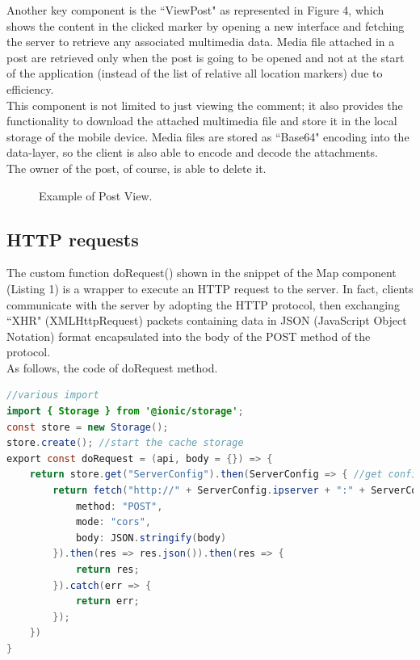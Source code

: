 \documentclass[conference]{IEEEtran}
\begin{document}
Another key component is the ``ViewPost" as represented in Figure 4, which shows the content in the clicked marker by opening a new interface and fetching the server to retrieve any associated multimedia data.
Media file attached in a post are retrieved only when the post is going to be opened and not at the start of the application (instead of the list of relative all location markers) due to efficiency.
\\
This component is not limited to just viewing the comment; it also provides the functionality to download the attached multimedia file and store it in the local storage of the mobile device.
Media files are stored as ``Base64" encoding into the data-layer, so the client is also able to encode and decode the attachments.
\\
The owner of the post, of course, is able to delete it.

\begin{figure}[htbp]
\begin{center}
\end{center}
\caption{Example of Post View.}
\label{fig}
\end{figure}
\FloatBarrier 


\subsection{HTTP requests}

The custom function doRequest() shown in the snippet of the Map component (Listing 1) is a wrapper to execute an HTTP request to the server.
In fact, clients communicate with the server by adopting the HTTP protocol, then exchanging ``XHR" (XMLHttpRequest) packets containing data in JSON (JavaScript Object Notation) format encapsulated into the body of the POST method of the protocol.
\\
As follows, the code of doRequest method.
\begin{lstlisting}[language=Java, caption=Method doRequest to fetch server]
//various import 
import { Storage } from '@ionic/storage';
const store = new Storage(); 
store.create(); //start the cache storage
export const doRequest = (api, body = {}) => {
    return store.get("ServerConfig").then(ServerConfig => { //get config from cache
        return fetch("http://" + ServerConfig.ipserver + ":" + ServerConfig.port + "/" + api, {
            method: "POST",
            mode: "cors",
            body: JSON.stringify(body)
        }).then(res => res.json()).then(res => {
            return res;
        }).catch(err => {
            return err;
        });
    })
}
\end{lstlisting}
\end{document}
